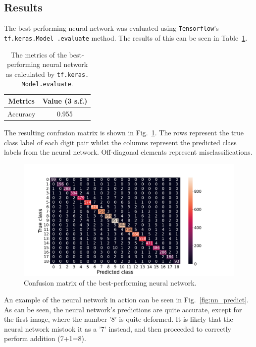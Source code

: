 \documentclass[11pt,a4paper]{article}
\begin{document}
\subsection{Results}
The best-performing neural network was evaluated using \texttt{Tensorflow}'s \texttt{tf.keras.Model .evaluate} method. The results of this can be seen in Table~\ref{tab:nn_eval}.
\begin{table}[ht]
    \centering
    \begin{tabular}{c|c}
        Metrics & Value (3 s.f.)\\
        \hline
        Accuracy & 0.955 \\
    \end{tabular}
    \caption{The metrics of the best-performing neural network as calculated by \texttt{tf.keras. Model.evaluate}.}\label{tab:nn_eval}
\end{table}

The resulting confusion matrix is shown in Fig.~\ref{fig:nn_confusion}. The rows represent the true class label of each digit pair whilst the columns represent the predicted class labels from the neural network. Off-diagonal elements represent misclassifications.

\begin{figure}[ht]
    \centering
    \includegraphics[width=\columnwidth, keepaspectratio]{../confusion_nn.png}
    \caption{Confusion matrix of the best-performing neural network. }\label{fig:nn_confusion}
\end{figure}

An example of the neural network in action can be seen in Fig.~\ref{fig:nn_predict}. As can be seen, the neural network's predictions are quite accurate, except for the first image, where the number '8' is quite deformed. It is likely that the neural network mistook it as a '7' instead, and then proceeded to correctly perform addition (7+1=8).
\end{document}
